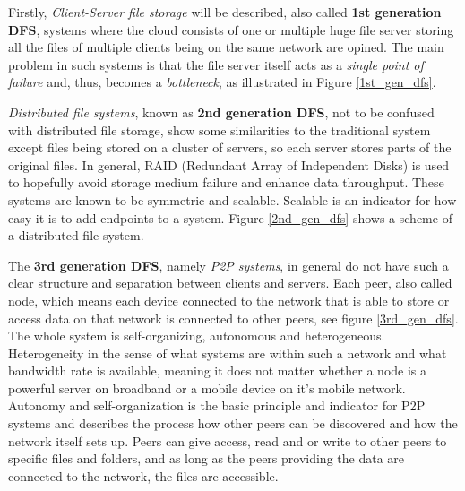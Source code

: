 Firstly, \textit{Client-Server file storage} will be described, also called \textbf{1st generation DFS}, systems where the cloud consists of one or multiple huge file server storing all the files of multiple clients being on the same network are opined. The main problem in such systems is that the file server itself acts as a \textit{single point of failure} and, thus, becomes a \textit{bottleneck}, as illustrated in Figure \ref{1st_gen_dfs}.

\textit{Distributed file systems}, known as \textbf{2nd generation DFS}, not to be confused with distributed file storage, show some similarities to the traditional system except files being stored on a cluster of servers, so each server stores parts of the original files. In general, RAID (Redundant Array of Independent Disks) is used to hopefully avoid storage medium failure and enhance data throughput. These systems are known to be symmetric and scalable. Scalable is an indicator for how easy it is to add endpoints to a system. Figure \ref{2nd_gen_dfs} shows a scheme of a distributed file system.

The \textbf{3rd generation DFS}, namely \textit{P2P systems}, in general do not have such a clear structure and separation between clients and servers. Each peer, also called node, which means each device connected to the network that is able to store or access data on that network is connected to other peers, see figure \ref{3rd_gen_dfs}. The whole system is self-organizing, autonomous and heterogeneous. Heterogeneity in the sense of what systems are within such a network and what bandwidth rate is available, meaning it does not matter whether a node is a powerful server on broadband or a mobile device on it's mobile network. Autonomy and self-organization is the basic principle and indicator for P2P systems and describes the process how other peers can be discovered and how the network itself sets up. Peers can give access, read and or write to other peers to specific files and folders, and as long as the peers providing the data are connected to the network, the files are accessible.
	
